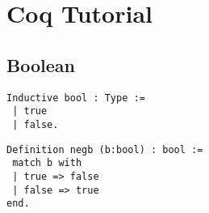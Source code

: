 \chapter{Coq Tutorial}

\section{Boolean}

\begin{lstlisting}[style=coq]
Inductive bool : Type :=
 | true
 | false.
\end{lstlisting}

\begin{lstlisting}[style=coq]
Definition negb (b:bool) : bool :=
 match b with	
 | true => false
 | false => true
end.
\end{lstlisting}


%
